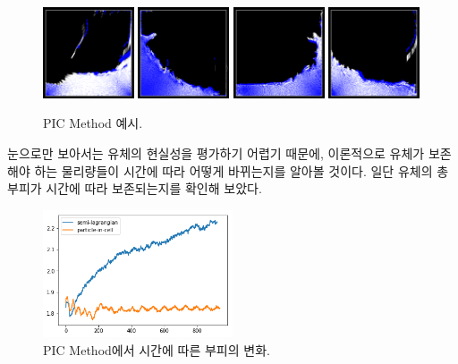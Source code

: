 \documentclass[12pt, A4]{article}
\begin{document}
\begin{figure}[h]
\includegraphics[width=0.24\textwidth]{realism-pic-1}
\includegraphics[width=0.24\textwidth]{realism-pic-2}
\includegraphics[width=0.24\textwidth]{realism-pic-3}
\includegraphics[width=0.24\textwidth]{realism-pic-4}
  \caption{PIC Method 예시.}
  \label{realism-pic}
\end{figure}

눈으로만 보아서는 유체의 현실성을 평가하기 어렵기 때문에, 이론적으로 유체가 보존해야 하는 물리량들이 시간에 따라 어떻게 바뀌는지를 알아볼 것이다. 일단 유체의 총 부피가 시간에 따라 보존되는지를 확인해 보았다.

\begin{figure}[h]
  \centering
  \includegraphics[width=0.5\textwidth]{picflip-volume-graph}
  \caption{PIC Method에서 시간에 따른 부피의 변화.}
  \label{volume-increase-graph}
\end{figure}
\end{document}
